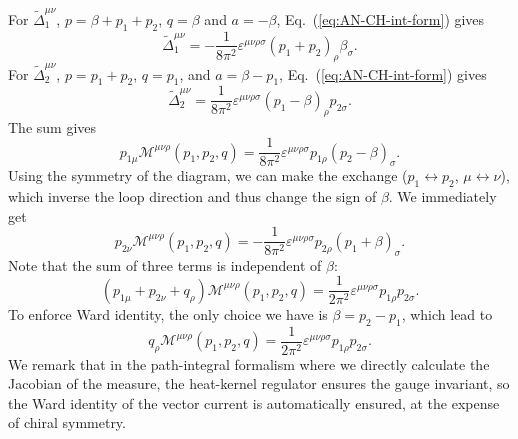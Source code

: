 \documentclass[aps,prb,superscriptaddress,nofootinbib]{revtex4}
\begin{document}
For $\tilde\Delta_{1}^{\mu\nu}$, $p=\beta+p_1+p_2$, $q=\beta$ and $a=-\beta$, Eq.~(\ref{eq:AN-CH-int-form}) gives
\begin{equation}
	\tilde\Delta^{\mu\nu}_1 = -\frac{1}{8\pi^2} \varepsilon^{\mu\nu\rho\sigma} (p_1+p_2)_\rho \beta_{\sigma}.
\end{equation}
For $\tilde\Delta_2^{\mu\nu}$, $p=p_1+p_2$, $q=p_1$, and $a=\beta-p_1$, Eq.~(\ref{eq:AN-CH-int-form}) gives
\begin{equation}
	\tilde\Delta^{\mu\nu}_2 = \frac{1}{8\pi^2} \varepsilon^{\mu\nu\rho\sigma} (p_1-\beta)_\rho p_{2\sigma}.
\end{equation}
The sum gives
\begin{equation}
	p_{1\mu} \mathcal{M}^{\mu\nu\rho}(p_1,p_2,q) = \frac{1}{8\pi^2} \varepsilon^{\mu\nu\rho\sigma} p_{1\rho}(p_{2}-\beta)_\sigma.
\end{equation}
Using the symmetry of the diagram, we can make the exchange ($p_1 \leftrightarrow p_2$, $\mu \leftrightarrow \nu$), which inverse the loop direction and thus change the sign of $\beta$.
We immediately get
\begin{equation}
	p_{2\nu} \mathcal{M}^{\mu\nu\rho}(p_1,p_2,q) = -\frac{1}{8\pi^2} \varepsilon^{\mu\nu\rho\sigma} p_{2\rho}(p_{1}+\beta)_\sigma.
\end{equation}
Note that the sum of three terms is independent of $\beta$:
\begin{equation}
	(p_{1\mu}+p_{2\nu}+q_{\rho}) \mathcal M^{\mu\nu\rho}(p_1,p_2,q) = \frac{1}{2\pi^2} \varepsilon^{\mu\nu\rho\sigma} p_{1\rho} p_{2\sigma}.
\end{equation}
To enforce Ward identity, the only choice we have is $\beta = p_2-p_1$, which lead to
\begin{equation}
	q_\rho \mathcal{M}^{\mu\nu\rho}(p_1,p_2,q) = \frac{1}{2\pi^2} \varepsilon^{\mu\nu\rho\sigma} p_{1\rho} p_{2\sigma}.
\end{equation}
We remark that in the path-integral formalism where we directly calculate the Jacobian of the measure, the heat-kernel regulator ensures the gauge invariant, so the Ward identity of the vector current is automatically ensured, at the expense of chiral symmetry.
\end{document}
